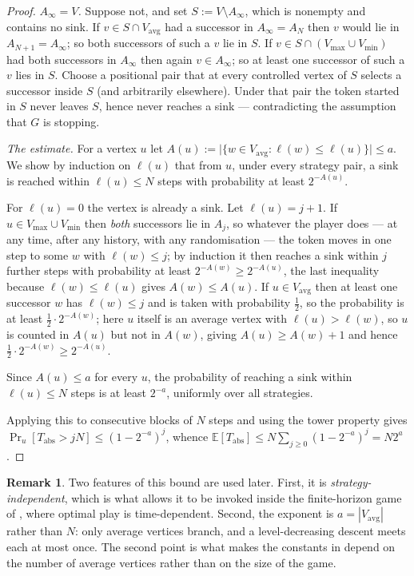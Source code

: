 \documentclass[11pt]{article}
\theoremstyle{plain}
\theoremstyle{definition}
\newtheorem{remark}[theorem]{Remark}
\newcommand{\Vmax}{V_{\max}}
\newcommand{\Vmin}{V_{\min}}
\newcommand{\Vavg}{V_{\mathrm{avg}}}
\begin{document}
\begin{proof}
\emph{$A_\infty=V$.} Suppose not, and set $S:=V\setminus A_\infty$, which
is nonempty and contains no sink. If $v\in S\cap\Vavg$ had a successor in
$A_\infty=A_N$ then $v$ would lie in $A_{N+1}=A_\infty$; so both
successors of such a $v$ lie in $S$. If $v\in S\cap(\Vmax\cup\Vmin)$ had
both successors in $A_\infty$ then again $v\in A_\infty$; so at least one
successor of such a $v$ lies in $S$. Choose a positional pair that at
every controlled vertex of $S$ selects a successor inside $S$ (and
arbitrarily elsewhere). Under that pair the token started in $S$ never
leaves $S$, hence never reaches a sink --- contradicting the assumption
that $G$ is stopping.

\emph{The estimate.} For a vertex $u$ let
$A(u):=\bigl|\{w\in\Vavg:\ell(w)\le\ell(u)\}\bigr|\le a$. We show by
induction on $\ell(u)$ that from $u$, under every strategy pair, a sink is
reached within $\ell(u)\le N$ steps with probability at least
$2^{-A(u)}$.

For $\ell(u)=0$ the vertex is already a sink. Let $\ell(u)=j+1$. If
$u\in\Vmax\cup\Vmin$ then \emph{both} successors lie in $A_j$, so whatever
the player does --- at any time, after any history, with any
randomisation --- the token moves in one step to some $w$ with
$\ell(w)\le j$; by induction it then reaches a sink within $j$ further
steps with probability at least $2^{-A(w)}\ge 2^{-A(u)}$, the last
inequality because $\ell(w)\le\ell(u)$ gives $A(w)\le A(u)$. If
$u\in\Vavg$ then at least one successor $w$ has $\ell(w)\le j$ and is
taken with probability $\tfrac12$, so the probability is at least
$\tfrac12\cdot2^{-A(w)}$; here $u$ itself is an average vertex with
$\ell(u)>\ell(w)$, so $u$ is counted in $A(u)$ but not in $A(w)$, giving
$A(u)\ge A(w)+1$ and hence $\tfrac12\cdot2^{-A(w)}\ge2^{-A(u)}$.

Since $A(u)\le a$ for every $u$, the probability of reaching a sink within
$\ell(u)\le N$ steps is at least $2^{-a}$, uniformly over all strategies.

Applying this to consecutive blocks of $N$ steps and using the tower
property gives $\Pr_u[T_{\mathrm{abs}}>jN]\le(1-2^{-a})^j$, whence
$\mathbb{E}[T_{\mathrm{abs}}]\le N\sum_{j\ge0}(1-2^{-a})^j=N2^{a}$.
\end{proof}

\begin{remark}
Two features of this bound are used later. First, it is
\emph{strategy-independent}, which is what allows it to be invoked inside
the finite-horizon game of , where optimal play is
time-dependent. Second, the exponent is $a=|\Vavg|$ rather than $N$: only
average vertices branch, and a level-decreasing descent meets each at
most once. The second point is what makes the constants in
 depend on the number of average
vertices rather than on the size of the game.
\end{remark}
\end{document}
